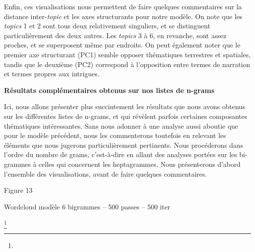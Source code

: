 \documentclass[letterpaper,portrait,12pt]{article}
\begin{document}
\textcolor[rgb]{0.000,0.000,0.000}{	Enfin, ces visualisations nous permettent de faire quelques commentaires sur la distance inter-}\emph{\textcolor[rgb]{0.000,0.000,0.000}{topic}}\textcolor[rgb]{0.000,0.000,0.000}{ et les axes structurants pour notre mod\`{e}le. On note que les }\emph{\textcolor[rgb]{0.000,0.000,0.000}{topics}}\textcolor[rgb]{0.000,0.000,0.000}{ 1 et 2 sont tous deux relativement singuliers, et se distinguent particuli\`{e}rement des deux autres. Les }\emph{\textcolor[rgb]{0.000,0.000,0.000}{topics}}\textcolor[rgb]{0.000,0.000,0.000}{ 3 \`{a} 6, en revanche, sont assez proches, et se superposent m\^{e}me par endroits. On peut \'{e}galement noter que le premier axe structurant (PC1) semble opposer th\'{e}matiques terrestres et spatiales, tandis que le deuxi\`{e}me (PC2) correspond \`{a} l'opposition entre termes de narration et termes propres aux intrigues.}


\textbf{\textcolor[rgb]{0.000,0.000,0.000}{	R\'{e}sultats compl\'{e}mentaires obtenus sur nos listes de n-grams}}





	Ici, nous allons pr\'{e}senter plus succintement les r\'{e}sultats que nous avons obtenus sur les diff\'{e}rentes listes de n-grams, et qui r\'{e}v\`{e}lent parfois certaines composantes th\'{e}matiques int\'{e}ressantes. Sans nous adonner \`{a} une analyse aussi aboutie que pour le mod\`{e}le pr\'{e}c\'{e}dent, nous les commenterons toutefois en relevant les \'{e}l\'{e}ments que nous jugerons particuli\`{e}rement pertinents. Nous proc\'{e}derons dans l'ordre du nombre de grams, c'est-\`{a}-dire en allant des analyses port\'{e}es sur les bi-grammes \`{a} celles qui concernent les heptagrammes. Nous pr\'{e}senterons d'abord l'ensemble des visualisations, avant de faire quelques commentaires.











Figure 13





Wordcloud mod\`{e}le 6 bigrammes -- 500 passes -- 500 iter





\footnote{} 
\end{document}
